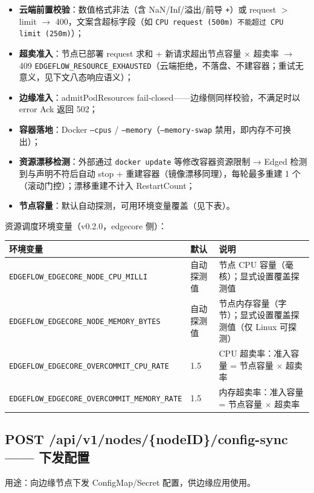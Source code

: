 \begin{itemize}
  \item \textbf{云端前置校验}：数值格式非法（含 NaN/Inf/溢出/前导 \texttt{+}）或 request $>$ limit $\rightarrow$ 400，文案含超标字段（如 \texttt{CPU request (500m) 不能超过 CPU limit (250m)}）；
  \item \textbf{超卖准入}：节点已部署 request 求和 + 新请求超出节点容量 $\times$ 超卖率 $\rightarrow$ 409 \texttt{EDGEFLOW\_RESOURCE\_EXHAUSTED}（云端拒绝，不落盘、不建容器；重试无意义，见下文八态响应语义）；
  \item \textbf{边缘准入}：admitPodResources fail-closed——边缘侧同样校验，不满足时以 error Ack 返回 502；
  \item \textbf{容器落地}：Docker \texttt{--cpus} / \texttt{--memory}（\texttt{--memory-swap} 禁用，即内存不可换出）；
  \item \textbf{资源漂移检测}：外部通过 \texttt{docker update} 等修改容器资源限制 → Edged 检测到与声明不符后自动 stop + 重建容器（镜像漂移同理），每轮最多重建 1 个（滚动门控）；漂移重建不计入 RestartCount；
  \item \textbf{节点容量}：默认自动探测，可用环境变量覆盖（见下表）。
\end{itemize}

资源调度环境变量（v0.2.0，edgecore 侧）：

\begin{tabularx}{\textwidth}{l l X}
  \toprule
  \textbf{环境变量} & \textbf{默认} & \textbf{说明} \\
  \midrule
  \texttt{EDGEFLOW\_EDGECORE\_NODE\_CPU\_MILLI} & 自动探测值 & 节点 CPU 容量（毫核）；显式设置覆盖探测值 \\
  \texttt{EDGEFLOW\_EDGECORE\_NODE\_MEMORY\_BYTES} & 自动探测值 & 节点内存容量（字节）；显式设置覆盖探测值（仅 Linux 可探测） \\
  \texttt{EDGEFLOW\_EDGECORE\_OVERCOMMIT\_CPU\_RATE} & 1.5 & CPU 超卖率：准入容量 = 节点容量 $\times$ 超卖率 \\
  \texttt{EDGEFLOW\_EDGECORE\_OVERCOMMIT\_MEMORY\_RATE} & 1.5 & 内存超卖率：准入容量 = 节点容量 $\times$ 超卖率 \\
  \bottomrule
\end{tabularx}

\subsection{POST /api/v1/nodes/\{nodeID\}/config-sync —— 下发配置}

用途：向边缘节点下发 ConfigMap/Secret 配置，供边缘应用使用。

